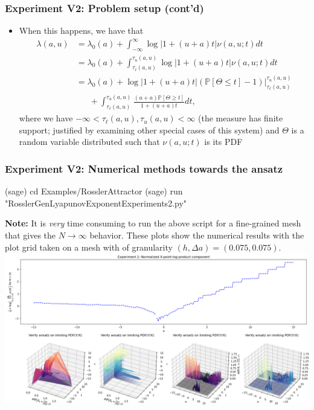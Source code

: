 \documentclass[usenames,svgnames,dvipsnames,10pt]{beamer}
\begin{document}
\begin{frame}
\frametitle{Experiment V2: Problem setup (cont'd)}

\begin{itemize} 

\item When this happens, we have that 
      \begin{align*}
      \lambda(a, u) & = \lambda_0(a) + \int_{-\infty}^{\infty} \log\left\lvert 1 + (u+a)t \right\rvert 
           \nu(a, u; t) dt \\ 
           & = \lambda_0(a) + \int_{\tau_{\ell}(a, u)}^{\tau_u(a, u)} \log\left\lvert 1 + (u+a)t \right\rvert 
           \nu(a, u; t) dt \\ 
           & = \lambda_0(a) + 
           \log\left\lvert 1 + (u+a)t \right\rvert \left(\mathbb{P}\left[\Theta \leq t\right] - 1\right)
           \Biggr\rvert_{\tau_{\ell}(a, u)}^{\tau_u(a, u)} \\ 
           & \phantom{=\ } + 
           \int_{\tau_{\ell}(a, u)}^{\tau_u(a, u)} \frac{(u+a) \mathbb{P}\left[\Theta \geq t\right]}{1+(u+a)t} dt, 
      \end{align*} 
      where we have $-\infty < \tau_{\ell}(a, u), \tau_u(a, u) < \infty$ (the measure has finite support; 
      justified by examining other special cases of this system) and $\Theta$ is a random variable 
      distributed such that $\nu(a, u; t)$ is its PDF 

\end{itemize}

\end{frame}

\begin{frame}[fragile]
\frametitle{Experiment V2: Numerical methods towards the ansatz}

\begin{center}
\begin{code}
(sage) cd Examples/RosslerAttractor
(sage) run "RosslerGenLyapunovExponentExperiments2.py"
\end{code}
\textbf{Note:} It is \emph{very} time consuming to run the above script for a fine-grained mesh 
that gives the $N \rightarrow \infty$ behavior. These plots show the numerical results with the 
plot grid taken on a mesh with of granularity 
$(h, \Delta a) = (0.075, 0.075)$. \\ 
\includegraphics[height=0.65\textheight]{../Images/RosslerAttractorExpt2-2021-10-28-031737.png}
\end{center}

\end{frame}
\end{document}
